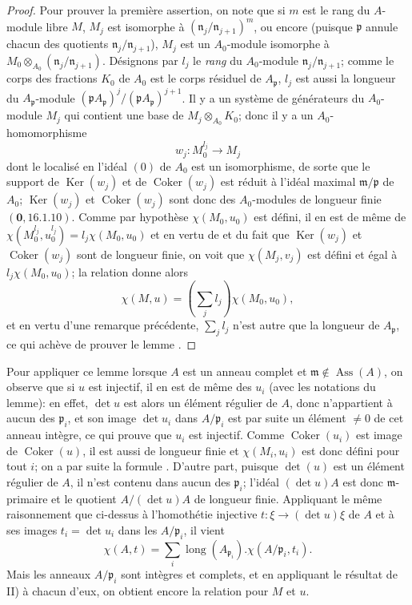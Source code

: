 \begin{proof}
Pour prouver la première assertion, on note que si $m$ est le rang du $A$-module libre $M$, $M_j$ est isomorphe à $(\mathfrak{n}_j/\mathfrak{n}_{j+1})^m$, ou encore (puisque $\mathfrak{p}$ annule chacun des quotients $\mathfrak{n}_j/\mathfrak{n}_{j+1}$), $M_j$ est un $A_0$-module isomorphe à $M_0\otimes_{A_0}(\mathfrak{n}_j/\mathfrak{n}_{j+1})$.
Désignons par $l_j$ le \emph{rang} du $A_0$-module $\mathfrak{n}_j/\mathfrak{n}_{j+1}$;
comme le corps des fractions $K_0$ de $A_0$ est le corps résiduel de $A_{\mathfrak{p}}$, $l_j$ est aussi la longueur du $A_{\mathfrak{p}}$-module $(\mathfrak{p}A_{\mathfrak{p}})^j/(\mathfrak{p}A_{\mathfrak{p}})^{j+1}$.
Il y a un système de générateurs du $A_0$-module $M_j$ qui contient une base de $M_j\otimes_{A_0}K_0$;
donc il y a un $A_0$-homomorphisme
\[
  w_j:M_0^{l_j}\to M_j
\]
dont le localisé en l'idéal $(0)$ de $A_0$ est un isomorphisme, de sorte que le support de $\operatorname{Ker}(w_j)$ et de $\operatorname{Coker}(w_j)$ est réduit à l'idéal maximal $\mathfrak{m}/\mathfrak{p}$ de $A_0$;
$\operatorname{Ker}(w_j)$ et $\operatorname{Coker}(w_j)$ sont donc des $A_0$-modules de longueur finie $(\mathbf{0},16.1.10)$.
Comme par hypothèse $\chi(M_0,u_0)$ est défini, il en est de même de $\chi(M_0^{l_j},u_0^{l_j})=l_j\chi(M_0,u_0)$ et en vertu de  et du fait que $\operatorname{Ker}(w_j)$ et $\operatorname{Coker}(w_j)$ sont de longueur finie, on voit que $\chi(M_j,v_j)$ est défini et égal à $l_j\chi(M_0,u_0)$;
la relation  donne alors
\[
  \chi(M,u)=\left(\sum_jl_j\right)\chi(M_0,u_0),
\]
et en vertu d'une remarque précédente, $\sum_jl_j$ n'est autre que la longueur de $A_{\mathfrak{p}}$, ce qui achève de prouver le lemme .
\end{proof}

Pour appliquer ce lemme lorsque $A$ est un anneau complet et $\mathfrak{m}\notin\operatorname{Ass}(A)$, on observe que si $u$ est injectif, il en est de même des $u_i$ (avec les notations du lemme):
en effet, $\det u$ est alors un élément régulier de $A$, donc n'appartient à aucun des $\mathfrak{p}_i$, et son image $\det u_i$ dans $A/\mathfrak{p}_i$ est par suite un élément $\neq0$ de cet anneau intègre, ce qui prouve que $u_i$ est injectif.
Comme $\operatorname{Coker}(u_i)$ est image de $\operatorname{Coker}(u)$, il est aussi de longueur finie et $\chi(M_i,u_i)$ est donc défini pour tout $i$;
on a par suite la formule .
D'autre part, puisque $\det(u)$ est un élément régulier de $A$, il n'est contenu dans aucun des $\mathfrak{p}_i$;
l'idéal $(\det u)A$ est donc $\mathfrak{m}$-primaire et le quotient $A/(\det u)A$ de longueur finie.
Appliquant le même raisonnement que ci-dessus à l'homothétie injective $t:\xi\to(\det u)\xi$ de $A$ et à ses images $t_i=\det u_i$ dans les $A/\mathfrak{p}_i$, il vient
\[
  \chi(A,t)=\sum_i\operatorname{long}(A_{\mathfrak{p}_i}).\chi(A/\mathfrak{p}_i,t_i).
\]
Mais les anneaux $A/\mathfrak{p}_i$ sont intègres et complets, et en appliquant le résultat de II) à chacun d'eux, on obtient encore la relation  pour $M$ et $u$.

